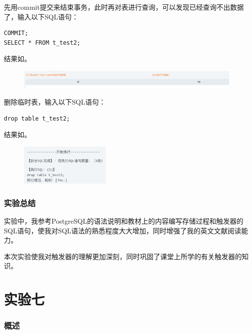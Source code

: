 \documentclass[lang=cn,11pt,a4paper,cite=authornum]{paper}
\begin{document}
先用commit提交来结束事务，此时再对表进行查询，可以发现已经查询不出数据了，输入以下SQL语句：
\begin{code}
\begin{verbatim}
COMMIT;
SELECT * FROM t_test2;
\end{verbatim}
\end{code}

结果如。
\begin{figure}[!htb]
    \centering
    \includegraphics[width=\textwidth]{./images/res46.png}
    \caption{\label{fig:res46}}
\end{figure}

删除临时表，输入以下SQL语句：
\begin{code}
\begin{verbatim}
drop table t_test2;
\end{verbatim}
\end{code}

结果如。
\begin{figure}[!htb]
    \centering
    \includegraphics[width=0.4\textwidth]{./images/res47.png}
    \caption{\label{fig:res47}}
\end{figure}

\section{实验总结}

实验中，我参考PostgreSQL的语法说明和教材上的内容编写存储过程和触发器的SQL语句，使我对SQL语法的熟悉程度大大增加，同时增强了我的英文文献阅读能力。

本次实验使我对触发器的理解更加深刻，同时巩固了课堂上所学的有关触发器的知识。

\part{实验七}

\section{概述}
\end{document}
